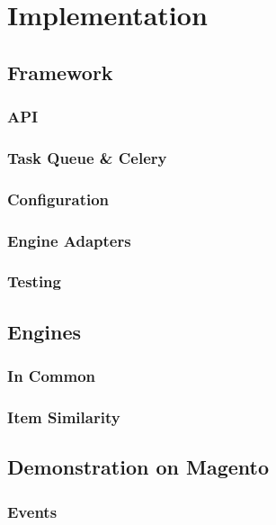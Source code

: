 \chapter{Implementation}

\section{Framework}

\subsection{API}

\subsection{Task Queue \& Celery}

\subsection{Configuration}

\subsection{Engine Adapters}

\subsection{Testing}

\section{Engines}

\subsection{In Common}

\subsection{Item Similarity}

\section{Demonstration on Magento}

\subsection{Events}

